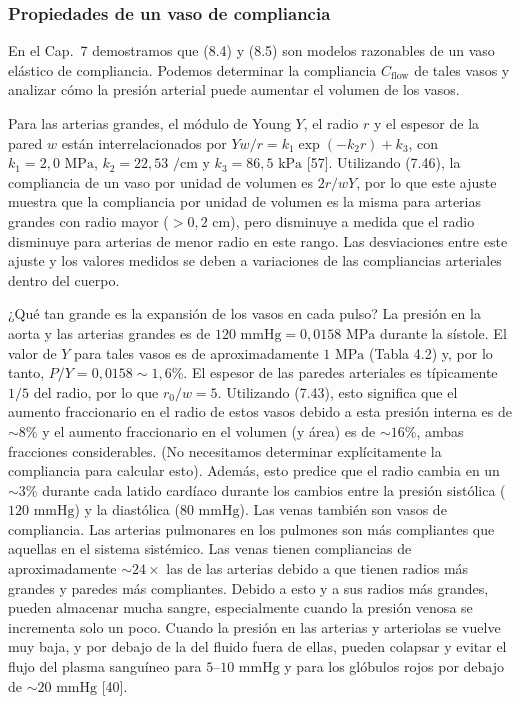 \documentclass[12pt]{book}
\begin{document}
\subsubsection*{Propiedades de un vaso de compliancia}

En el Cap.~7 demostramos que (8.4) y (8.5) son modelos razonables de un vaso elástico de compliancia. Podemos determinar la compliancia $C_{\text{flow}}$ de tales vasos y analizar cómo la presión arterial puede aumentar el volumen de los vasos.

Para las arterias grandes, el módulo de Young $Y$, el radio $r$ y el espesor de la pared $w$ están interrelacionados por $Yw/r = k_1 \exp(-k_2 r) + k_3$, con $k_1 = 2{,}0\text{ MPa}$, $k_2 = 22{,}53\text{ /cm}$ y $k_3 = 86{,}5\text{ kPa}$ [57]. Utilizando (7.46), la compliancia de un vaso por unidad de volumen es $2r/wY$, por lo que este ajuste muestra que la compliancia por unidad de volumen es la misma para arterias grandes con radio mayor ($>0{,}2\text{ cm}$), pero disminuye a medida que el radio disminuye para arterias de menor radio en este rango. Las desviaciones entre este ajuste y los valores medidos se deben a variaciones de las compliancias arteriales dentro del cuerpo.

¿Qué tan grande es la expansión de los vasos en cada pulso? La presión en la aorta y las arterias grandes es de $120\text{ mmHg} = 0{,}0158\text{ MPa}$ durante la sístole. El valor de $Y$ para tales vasos es de aproximadamente $1\text{ MPa}$ (Tabla 4.2) y, por lo tanto, $P/Y = 0{,}0158 \sim 1{,}6\%$. El espesor de las paredes arteriales es típicamente $1/5$ del radio, por lo que $r_0/w = 5$. Utilizando (7.43), esto significa que el aumento fraccionario en el radio de estos vasos debido a esta presión interna es de ${\sim}8\%$ y el aumento fraccionario en el volumen (y área) es de ${\sim}16\%$, ambas fracciones considerables. (No necesitamos determinar explícitamente la compliancia para calcular esto). Además, esto predice que el radio cambia en un ${\sim}3\%$ durante cada latido cardíaco durante los cambios entre la presión sistólica ($120\text{ mmHg}$) y la diastólica ($80\text{ mmHg}$). Las venas también son vasos de compliancia. Las arterias pulmonares en los pulmones son más compliantes que aquellas en el sistema sistémico. Las venas tienen compliancias de aproximadamente ${\sim}24\times$ las de las arterias debido a que tienen radios más grandes y paredes más compliantes. Debido a esto y a sus radios más grandes, pueden almacenar mucha sangre, especialmente cuando la presión venosa se incrementa solo un poco. Cuando la presión en las arterias y arteriolas se vuelve muy baja, y por debajo de la del fluido fuera de ellas, pueden colapsar y evitar el flujo del plasma sanguíneo para $5\text{--}10\text{ mmHg}$ y para los glóbulos rojos por debajo de ${\sim}20\text{ mmHg}$ [40].
\end{document}
